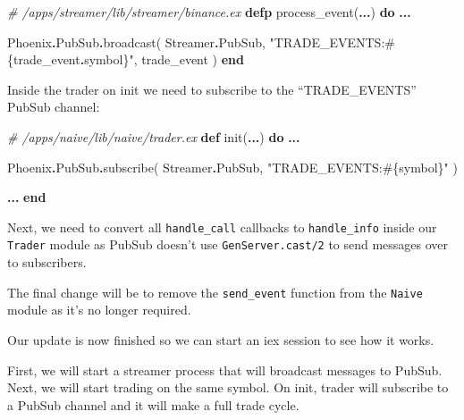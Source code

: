 \documentclass[
  oneside]{book}
\newenvironment{Shaded}{\begin{snugshade}}{\end{snugshade}}
\newcommand{\CommentTok}[1]{\textcolor[rgb]{0.56,0.35,0.01}{\textit{#1}}}
\newcommand{\ConstantTok}[1]{\textcolor[rgb]{0.00,0.00,0.00}{#1}}
\newcommand{\KeywordTok}[1]{\textcolor[rgb]{0.13,0.29,0.53}{\textbf{#1}}}
\newcommand{\NormalTok}[1]{#1}
\newcommand{\OperatorTok}[1]{\textcolor[rgb]{0.81,0.36,0.00}{\textbf{#1}}}
\newcommand{\OtherTok}[1]{\textcolor[rgb]{0.56,0.35,0.01}{#1}}
\newcommand{\StringTok}[1]{\textcolor[rgb]{0.31,0.60,0.02}{#1}}
\begin{document}
\begin{Shaded}
\begin{Highlighting}[]
\CommentTok{\# /apps/streamer/lib/streamer/binance.ex}
  \KeywordTok{defp}\NormalTok{ process\_event(}\OperatorTok{...}\NormalTok{) }\KeywordTok{do}
    \OperatorTok{...}

    \ConstantTok{Phoenix}\OperatorTok{.}\ConstantTok{PubSub}\OperatorTok{.}\NormalTok{broadcast(}
      \ConstantTok{Streamer}\OperatorTok{.}\ConstantTok{PubSub}\NormalTok{,}
      \StringTok{"TRADE\_EVENTS:}\OtherTok{\#\{}\NormalTok{trade\_event}\OperatorTok{.}\NormalTok{symbol}\OtherTok{\}}\StringTok{"}\NormalTok{,}
\NormalTok{      trade\_event}
\NormalTok{    )}
  \KeywordTok{end}
\end{Highlighting}
\end{Shaded}

Inside the trader on init we need to subscribe to the ``TRADE\_EVENTS'' PubSub channel:

\begin{Shaded}
\begin{Highlighting}[]
\CommentTok{\# /apps/naive/lib/naive/trader.ex}
  \KeywordTok{def}\NormalTok{ init(}\OperatorTok{...}\NormalTok{) }\KeywordTok{do}
    \OperatorTok{...}

    \ConstantTok{Phoenix}\OperatorTok{.}\ConstantTok{PubSub}\OperatorTok{.}\NormalTok{subscribe(}
      \ConstantTok{Streamer}\OperatorTok{.}\ConstantTok{PubSub}\NormalTok{,}
      \StringTok{"TRADE\_EVENTS:}\OtherTok{\#\{}\NormalTok{symbol}\OtherTok{\}}\StringTok{"}
\NormalTok{    )}

    \OperatorTok{...}
  \KeywordTok{end}
\end{Highlighting}
\end{Shaded}

Next, we need to convert all \texttt{handle\_call} callbacks to \texttt{handle\_info} inside our \texttt{Trader} module as PubSub doesn't use \texttt{GenServer.cast/2} to send messages over to subscribers.

The final change will be to remove the \texttt{send\_event} function from the \texttt{Naive}
module as it's no longer required.

Our update is now finished so we can start an iex session to see how it works.

First, we will start a streamer process that will broadcast messages
to PubSub. Next, we will start trading on the same symbol. On init, trader will subscribe to a PubSub channel and it will make a full trade cycle.
\end{document}
